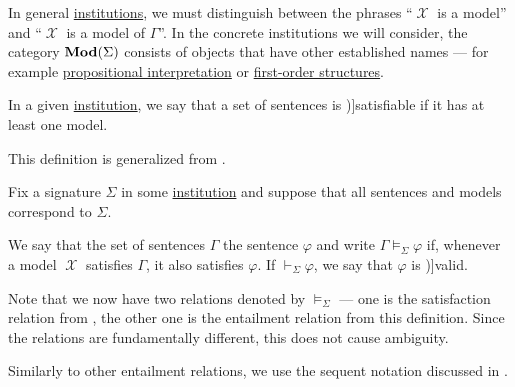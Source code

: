 \begin{remark}\label{rem:institutional_model_terminology}
  In general \hyperref[def:institution]{institutions}, we must distinguish between the phrases \enquote{\( \mscrX \) is a model} and \enquote{\( \mscrX \) is a model of \( \Gamma \)}. In the concrete institutions we will consider, the category \( \op*{Mod}(\Sigma) \) consists of objects that have other established names --- for example \hyperref[def:propositional_valuation/interpretation]{propositional interpretation} or \hyperref[def:first_order_structure]{first-order structures}.
\end{remark}

\begin{definition}\label{def:satisfiable_set_of_sentences}\mimprovised
   In a given \hyperref[def:institution]{institution}, we say that a set of sentences is \term[ru=совместное (\cite[def. 1.3.17]{Герасимов2011Вычислимость})]{satisfiable} if it has at least one model.
\end{definition}
\begin{comments}
  \item This definition is generalized from .
\end{comments}

\begin{definition}\label{def:institutional_entailment}
  Fix a signature \( \Sigma \) in some \hyperref[def:institution]{institution} and suppose that all sentences and models correspond to \( \Sigma \).

  We say that the set of sentences \( \Gamma \)  the sentence \( \varphi \) and write \( \Gamma \vDash_\Sigma \varphi \) if, whenever a model \( \mscrX \) satisfies \( \Gamma \), it also satisfies \( \varphi \). If \( \vdash_\Sigma \varphi \), we say that \( \varphi \) is \term[en=valid (\cite[def. 2.2.1]{Hinman2005Logic})]{valid}.
\end{definition}
\begin{comments}
  \item Note that we now have two relations denoted by \( \vDash_\Sigma \) --- one is the satisfaction relation from , the other one is the entailment relation from this definition. Since the relations are fundamentally different, this does not cause ambiguity.

  \item Similarly to other entailment relations, we use the sequent notation discussed in .
\end{comments}

